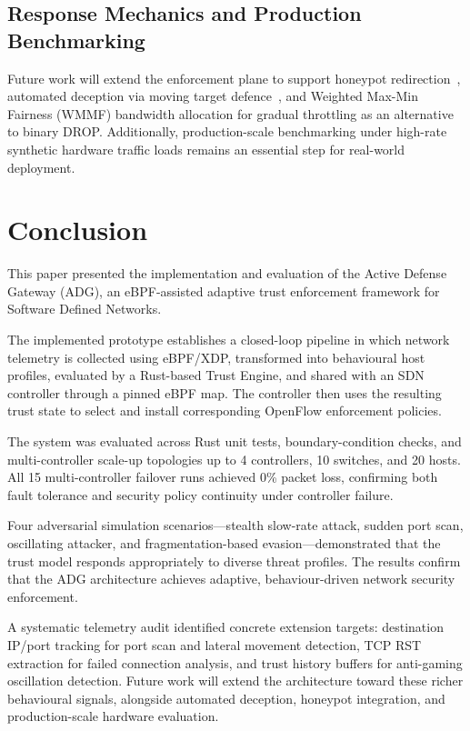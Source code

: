 \documentclass[conference]{IEEEtran}
\begin{document}
\subsection{Response Mechanics and Production Benchmarking}
Future work will extend the enforcement plane to support honeypot redirection~\cite{provos2004virtual}, automated deception via moving target defence~\cite{jajodia2011mtd}, and Weighted Max-Min Fairness (WMMF) bandwidth allocation for gradual throttling as an alternative to binary DROP. Additionally, production-scale benchmarking under high-rate synthetic hardware traffic loads remains an essential step for real-world deployment.


\section{Conclusion}

This paper presented the implementation and evaluation of the Active Defense Gateway (ADG), an eBPF-assisted adaptive trust enforcement framework for Software Defined Networks.

The implemented prototype establishes a closed-loop pipeline in which network telemetry is collected using eBPF/XDP, transformed into behavioural host profiles, evaluated by a Rust-based Trust Engine, and shared with an SDN controller through a pinned eBPF map. The controller then uses the resulting trust state to select and install corresponding OpenFlow enforcement policies.

The system was evaluated across Rust unit tests, boundary-condition checks, and multi-controller scale-up topologies up to 4 controllers, 10 switches, and 20 hosts. All 15 multi-controller failover runs achieved 0\% packet loss, confirming both fault tolerance and security policy continuity under controller failure.

Four adversarial simulation scenarios---stealth slow-rate attack, sudden port scan, oscillating attacker, and fragmentation-based evasion---demonstrated that the trust model responds appropriately to diverse threat profiles. The results confirm that the ADG architecture achieves adaptive, behaviour-driven network security enforcement.

A systematic telemetry audit identified concrete extension targets: destination IP/port tracking for port scan and lateral movement detection, TCP RST extraction for failed connection analysis, and trust history buffers for anti-gaming oscillation detection. Future work will extend the architecture toward these richer behavioural signals, alongside automated deception, honeypot integration, and production-scale hardware evaluation.
\end{document}
